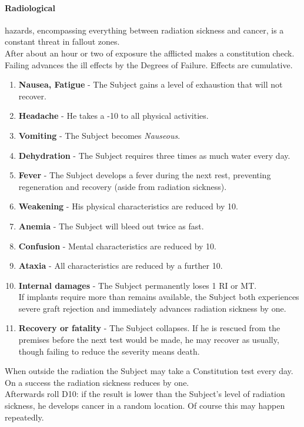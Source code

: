 \documentclass[11pt,a4paper,openany,dvipsnames]{book}
\begin{document}
	\paragraph{Radiological} hazards, encompassing everything between radiation sickness and cancer, is a constant threat in fallout zones.\\
	After about an hour or two of exposure the afflicted makes a constitution check. Failing advances the ill effects by the Degrees of Failure.
	Effects are cumulative.
	\begin{enumerate}
		\setlength\itemsep{-10mm}
		\item \textbf{Nausea, Fatigue} - The Subject gains a level of exhaustion that will not recover.
		\item \textbf{Headache} - He takes a -10 to all physical activities.
		\item \textbf{Vomiting} - The Subject becomes \emph{Nauseous}.
		\item \textbf{Dehydration} - The Subject requires three times as much water every day.
		\item \textbf{Fever} - The Subject develops a fever during the next rest,
			preventing regeneration and recovery (aside from radiation sickness).
		\item \textbf{Weakening} - His physical characteristics are reduced by 10.
		\item \textbf{Anemia} - The Subject will bleed out twice as fast.
		\item \textbf{Confusion} - Mental characteristics are reduced by 10.
		\item \textbf{Ataxia} - All characteristics are reduced by a further 10.
		\item \textbf{Internal damages} - The Subject permanently loses 1 RI or MT.
			\\%
			If implants require more than remains available,
				the Subject both experiences severe graft rejection
				and immediately advances radiation sickness by one.
		\item \textbf{Recovery or fatality} - The Subject collapses.
			If he is rescued from the premises before the next test would be made,
				he may recover as usually,
				though failing to reduce the severity means death.
	\end{enumerate}
	\par
	When outside the radiation the Subject may take a Constitution test every day.
	On a success the radiation sickness reduces by one.
	\\%
	Afterwards roll D10: if the result is lower than the Subject's level of radiation sickness,
		he develops cancer in a random location.
	Of course this may happen repeatedly.
\end{document}
